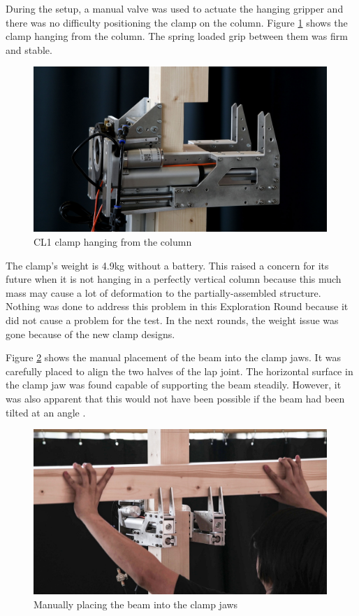 During the setup, a manual valve was used to actuate the hanging gripper and there was no difficulty positioning the clamp on the column. Figure \ref{fig:cl1-clamp-hanging-photo} shows the clamp hanging from the column. The spring loaded grip between them was firm and stable. 

\begin{figure}[h]
    \centering
    \includegraphics[width=0.99\textwidth]{images/04-4+5/cl1-test-closeup.jpg}
    \caption{CL1 clamp hanging from the column}
    \label{fig:cl1-clamp-hanging-photo}
\end{figure}

The clamp’s weight is 4.9kg without a battery. This raised a concern for its future when it is not hanging in a perfectly vertical column because this much mass may cause a lot of deformation to the partially-assembled structure. Nothing was done to address this problem in this Exploration Round because it did not cause a problem for the test. In the next rounds, the weight issue was gone because of the new clamp designs. 

Figure \ref{fig:manual-place-beam} shows the manual placement of the beam into the clamp jaws. It was carefully placed to align the two halves of the lap joint. The horizontal surface in the clamp jaw was found capable of supporting the beam steadily. However, it was also apparent that this would not have been possible if the beam had been tilted at an angle .

\begin{figure}
    \centering
    \includegraphics[width=0.99\textwidth]{images/04-4+5/experiment-manual-place-beam.jpg}
    \caption{Manually placing the beam into the clamp jaws}
    \label{fig:manual-place-beam}
\end{figure}

